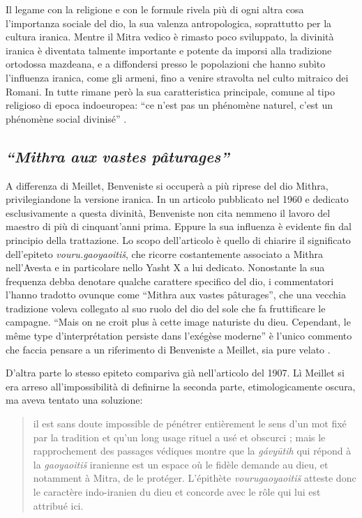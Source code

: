 \documentclass[output=paper]{langsci/langscibook}
\begin{document}
Il legame con la religione e con le formule rivela più di ogni altra cosa l’importanza sociale del dio, la sua valenza antropologica, soprattutto per la cultura iranica. Mentre il Mitra vedico è rimasto poco sviluppato, la divinità iranica è diventata talmente importante e potente da imporsi alla tradizione ortodossa mazdeana, e a diffondersi presso le popolazioni che hanno subìto l’influenza iranica, come gli armeni, fino a venire stravolta nel culto mitraico dei Romani. In tutte rimane però la sua caratteristica principale, comune al tipo religioso di epoca indoeuropea: “ce n’est pas un phénomène naturel, c’est un phénomène social divinisé” \citep[159]{meillet_dieu_1907-1}.

\subsection{\textit{“Mithra} \textit{aux} \textit{vastes} \textit{pâturages”}}

A differenza di Meillet, Benveniste si occuperà a più riprese del dio Mithra, privilegiandone la versione iranica. In un articolo pubblicato nel 1960 e dedicato esclusivamente a questa divinità, Benveniste non cita nemmeno il lavoro del maestro di più di cinquant’anni prima. Eppure la sua influenza è evidente fin dal principio della trattazione. Lo scopo dell’articolo è quello di chiarire il significato dell’epiteto \textit{vouru.gaoyaoitiš}, che ricorre costantemente associato a Mithra nell’Avesta e in particolare nello Yasht X a lui dedicato. Nonostante la sua frequenza debba denotare qualche carattere specifico del dio, i commentatori l’hanno tradotto ovunque come “Mithra aux vastes pâturages”, che una vecchia tradizione voleva collegato al suo ruolo del dio del sole che fa fruttificare le campagne. “Mais on ne croit plus à cette image naturiste du dieu. Cependant, le même type d’interprétation persiste dans l’exégèse moderne” è l’unico commento che faccia pensare a un riferimento di Benveniste a Meillet, sia pure velato \citep[277]{benveniste_mithra_2015}.

D’altra parte lo stesso epiteto compariva già nell’articolo del 1907. Lì Meillet si era arreso all’impossibilità di definirne la seconda parte, etimologicamente oscura, ma aveva tentato una soluzione:

\begin{quote}
il est sans doute impossible de pénétrer entièrement le sens d’un mot fixé par la tradition et qu’un long usage rituel a usé et obscurci ; mais le rapprochement des passages védiques montre que la \textit{gávyūtih} qui répond à la \textit{gaoyaoitiš} iranienne est un espace où le fidèle demande au dieu, et notamment à Mitra, de le protéger. L’épithète \textit{vourugaoyaoitiš} atteste donc le caractère indo-iranien du dieu et concorde avec le rôle qui lui est attribué ici. \citep[156]{meillet_dieu_1907-1}
\end{quote}
\end{document}
